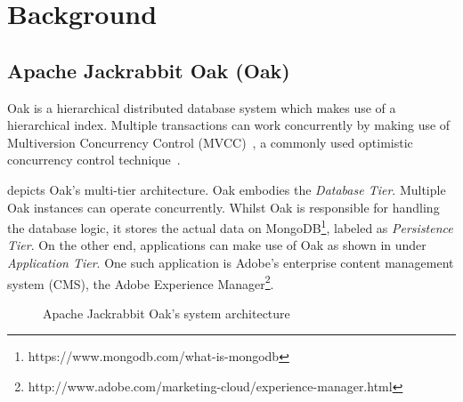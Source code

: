 \documentclass[abstracton,12pt]{scrartcl}
\theoremstyle{definition}
\begin{document}
\section{Background}

\subsection{Apache Jackrabbit Oak (Oak)}

Oak is a hierarchical distributed database system which makes use of a
hierarchical index. Multiple transactions can work concurrently by making use of
Multiversion Concurrency Control (MVCC)~\cite{GW02}, a commonly used optimistic
concurrency control technique~\cite{TM11}.

 depicts Oak's multi-tier architecture. Oak embodies the
\textit{Database Tier}. Multiple Oak instances can operate concurrently.
Whilst Oak is responsible for handling the database logic, it stores the actual
data on MongoDB\footnote{https://www.mongodb.com/what-is-mongodb}, labeled as
\textit{Persistence Tier}. On the other end, applications can make use of Oak as
shown in  under \textit{Application Tier}.
One such application is Adobe's enterprise content management system (CMS),
the Adobe Experience
Manager\footnote{http://www.adobe.com/marketing-cloud/experience-manager.html}.

\begin{figure}[h]
  \begin{center}
  \end{center}
  \caption{Apache Jackrabbit Oak's system architecture}
  \label{fig:architecture}
\end{figure}
\end{document}
